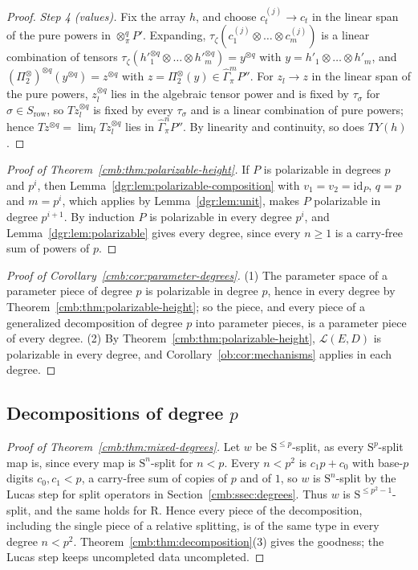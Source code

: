 \documentclass[11pt]{amsart}
\theoremstyle{definition}
\theoremstyle{remark}
\numberwithin{equation}{section}
\newcommand{\cL}{\mathcal L}
\newcommand{\id}{\mathrm{id}}
\theoremstyle{plain}
\theoremstyle{definition}
\theoremstyle{plain}
\newcommand{\hGamma}{\widehat\Gamma}
\begin{document}
\begin{proof}
\emph{Step 4 (values).} Fix the array $h$, and choose $c^{(j)}_t\to c_t$ in the linear span of the pure powers in
$\otimes^q_\pi P'$. Expanding, $\tau_\zeta(c^{(j)}_1\otimes\dots\otimes c^{(j)}_m)$ is a linear combination of tensors
$\tau_\zeta(h'^{\otimes q}_1\otimes\dots\otimes h'^{\otimes q}_m)=y^{\otimes q}$ with $y=h'_1\otimes\dots\otimes h'_m$, and
$(\Pi_2^\otimes)^{\otimes q}(y^{\otimes q})=z^{\otimes q}$ with $z=\Pi_2^\otimes(y)\in\hGamma^m_\pi P''$. For $z_l\to z$ in
the linear span of the pure powers, $z_l^{\otimes q}$ lies in the algebraic tensor power and is fixed by $\tau_\sigma$ for
$\sigma\in S_{\mathrm{row}}$, so $Tz_l^{\otimes q}$ is fixed by every $\tau_\sigma$ and is a linear combination of pure
powers; hence $Tz^{\otimes q}=\lim_lTz_l^{\otimes q}$ lies in $\hGamma^n_\pi P''$. By linearity and continuity, so does
$TY(h)$.
\end{proof}

\begin{proof}[Proof of Theorem~\ref{cmb:thm:polarizable-height}]
If $P$ is polarizable in degrees $p$ and $p^i$, then Lemma~\ref{dgr:lem:polarizable-composition} with $v_1=v_2=\id_P$,
$q=p$ and $m=p^i$, which applies by Lemma~\ref{dgr:lem:unit}, makes $P$ polarizable in degree $p^{i+1}$. By induction $P$
is polarizable in every degree $p^i$, and Lemma~\ref{dgr:lem:polarizable} gives every degree, since every $n\ge1$ is a
carry-free sum of powers of $p$.
\end{proof}

\begin{proof}[Proof of Corollary~\ref{cmb:cor:parameter-degrees}]
(1) The parameter space of a parameter piece of degree $p$ is polarizable in degree $p$, hence in every degree by
Theorem~\ref{cmb:thm:polarizable-height}; so the piece, and every piece of a generalized decomposition of degree $p$ into
parameter pieces, is a parameter piece of every degree. (2) By Theorem~\ref{cmb:thm:polarizable-height}, $\cL(E,D)$ is
polarizable in every degree, and Corollary~\ref{ob:cor:mechanisms} applies in each degree.
\end{proof}

\subsection{Decompositions of degree \texorpdfstring{$p$}{p}}\label{dgr:ssec:decompositions}

\begin{proof}[Proof of Theorem~\ref{cmb:thm:mixed-degrees}]
Let $w$ be $\mathrm S^{\le p}$-split, as every $\mathrm S^p$-split map is, since every map is $\mathrm S^n$-split for $n<p$.
Every $n<p^2$ is $c_1p+c_0$ with base-$p$ digits $c_0,c_1<p$, a carry-free sum of copies of $p$ and of $1$, so $w$ is
$\mathrm S^n$-split by the Lucas step for split operators in Section~\ref{cmb:ssec:degrees}. Thus $w$ is
$\mathrm S^{\le p^2-1}$-split, and the same holds for $\mathrm R$. Hence every piece of the decomposition, including the
single piece of a relative splitting, is of the same type in every degree $n<p^2$. Theorem~\ref{cmb:thm:decomposition}(3)
gives the goodness; the Lucas step keeps uncompleted data uncompleted.
\end{proof}
\end{document}
